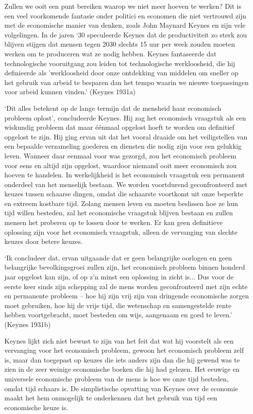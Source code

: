 \documentclass[
  a5paper,
  smalldemyvopaper,11pt,twoside,onecolumn,openright,extrafontsizes,
hidelinks]{memoir}
\begin{document}
Zullen we ooit een punt bereiken waarop we niet meer hoeven te werken?
Dit is een veel voorkomende fantasie onder politici en economen die niet
vertrouwd zijn met de economische manier van denken, zoals John Maynard
Keynes en zijn vele volgelingen. In de jaren `30 speculeerde Keynes dat
de productiviteit zo sterk zou blijven stijgen dat mensen tegen 2030
slechts 15 uur per week zouden moeten werken om te produceren wat ze
nodig hebben. Keynes fantaseerde dat technologische vooruitgang zou
leiden tot technologische werkloosheid, die hij definieerde als
'werkloosheid door onze ontdekking van middelen om sneller op het
gebruik van arbeid te besparen dan het tempo waarin we nieuwe
toepassingen voor arbeid kunnen vinden.' (Keynes 1931a)

`Dit alles betekent op de lange termijn dat de mensheid haar economisch
probleem oplost', concludeerde Keynes. Hij zag het economisch vraagstuk
als een wiskundig probleem dat maar éénmaal opgelost hoeft te worden om
definitief opgelost te zijn. Hij ging ervan uit dat het vooral draaide
om het veiligstellen van een bepaalde verzameling goederen en diensten
die nodig zijn voor een gelukkig leven. Wanneer daar eenmaal voor was
gezorgd, zou het economisch probleem voor eens en altijd zijn opgelost,
waardoor niemand ooit meer economisch zou hoeven te handelen. In
werkelijkheid is het economisch vraagstuk een permanent onderdeel van
het menselijk bestaan. We worden voortdurend geconfronteerd met keuzes
tussen schaarse dingen, omdat die schaarste voortkomt uit onze beperkte
en extreem kostbare tijd. Zolang mensen leven en moeten beslissen hoe ze
hun tijd willen besteden, zal het economische vraagstuk blijven bestaan
en zullen mensen het proberen op te lossen door te werken. Er kan geen
definitieve oplossing zijn voor het economisch vraagstuk, alleen de
vervanging van slechte keuzes door betere keuzes.

`Ik concludeer dat, ervan uitgaande dat er geen belangrijke oorlogen en
geen belangrijke bevolkingsgroei zullen zijn, het economisch probleem
binnen honderd jaar opgelost kan zijn, of op z'n minst een oplossing in
zicht is... Dus voor de eerste keer sinds zijn schepping zal de mens
worden geconfronteerd met zijn echte en permanente probleem -- hoe hij
zijn vrij zijn van dringende economische zorgen moet gebruiken, hoe hij
de vrije tijd, die wetenschap en samengestelde rente hebben
voortgebracht, moet besteden om wijs, aangenaam en goed te leven.'
(Keynes 1931b)

Keynes lijkt zich niet bewust te zijn van het feit dat wat hij voorstelt
als een vervanging voor het economisch probleem, gewoon het economisch
probleem zelf is, maar dan toegepast op keuzes die iets anders zijn dan
die hij gewend was te zien in de zeer weinige economische boeken die hij
had gelezen. Het eeuwige en universele economische probleem van de mens
is hoe we onze tijd besteden, omdat tijd schaars is. De simplistische
opvatting van Keynes over de economie maakt het hem onmogelijk te
onderkennen dat het gebruik van tijd een economische keuze is.
\end{document}
